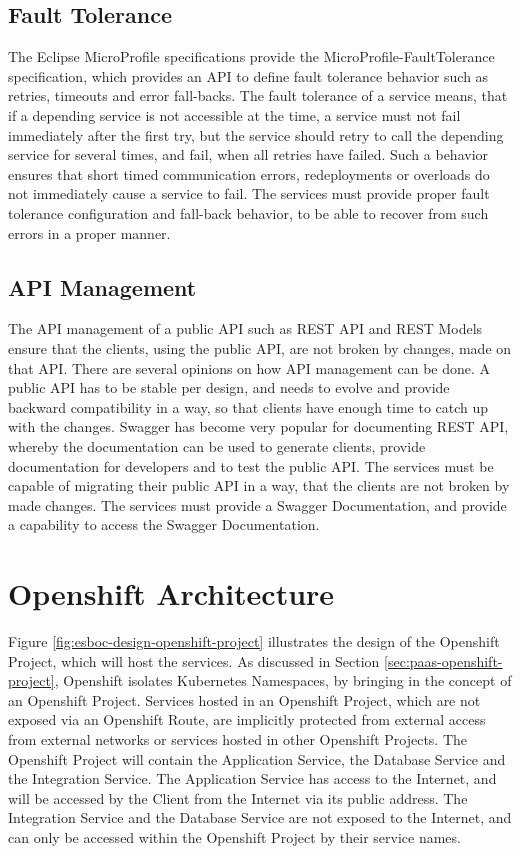 \subsection{Fault Tolerance}
\label{sec:esboc-requirements-service-fault}
The Eclipse MicroProfile specifications provide the MicroProfile-FaultTolerance specification, which provides an API to define fault tolerance behavior such as retries, timeouts and error fall-backs. The fault tolerance of a service means, that if a depending service is not accessible at the time, a service must not fail immediately after the first try, but the service should retry to call the depending service for several times, and fail, when all retries have failed. Such a behavior ensures that short timed communication errors, redeployments or overloads do not immediately cause a service to fail. The services must provide proper fault tolerance configuration and fall-back behavior, to be able to recover from such errors in a proper manner\cite{EclipseMicroprofileFault2018}.   

\subsection{API Management}
\label{sec:esboc-requirements-service-api}
The API management of a public API such as REST API and REST Models ensure that the clients, using the public API, are not broken by changes, made on that API. There are several opinions on how API management can be done. A public API has to be stable per design, and needs to evolve and provide backward compatibility in a way, so that clients have enough time to catch up with the changes. Swagger has become very popular for documenting REST API, whereby the documentation can be used to generate clients, provide documentation for developers and to test the public API. The services must be capable of migrating their public API in a way, that the clients are not broken by made changes. The services must provide a Swagger Documentation, and provide a capability to access the Swagger Documentation\cite{SmartBearSwagger2018, RestVersion2018}.

\section{Openshift Architecture}
\label{sec:esboc-design-oc}
Figure \vref{fig:esboc-design-openshift-project} illustrates the design of the Openshift Project, which will host the services. As discussed in Section \vref{sec:paas-openshift-project}, Openshift isolates Kubernetes Namespaces, by bringing in the concept of an Openshift Project. Services hosted in an Openshift Project, which are not exposed via an Openshift Route, are implicitly protected from external access from external networks or services hosted in other Openshift Projects. The Openshift Project will contain the Application Service, the Database Service and the Integration Service. The Application Service has access to the Internet, and will be accessed by the Client from the Internet via its public address. The Integration Service and the Database Service are not exposed to the Internet, and can only be accessed within the Openshift Project by their service names.

